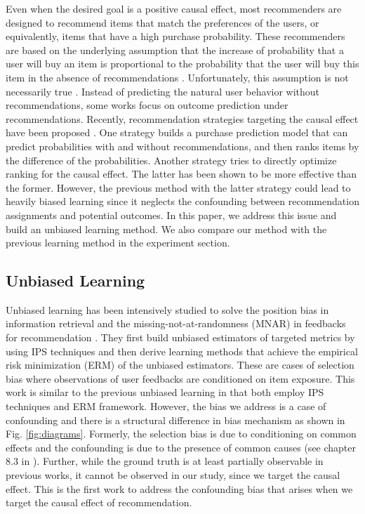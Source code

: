 \documentclass[manuscript,screen]{acmart}
\begin{document}
Even when the desired goal is a positive causal effect, most recommenders are designed to recommend items that match the preferences of the users, or equivalently, items that have a high purchase probability.
These recommenders are based on the underlying assumption that the increase of probability that a user will buy an item is proportional to the probability that the user will buy this item in the absence of recommendations \cite{Shani05}.
Unfortunately, this assumption is not necessarily true \cite{Sato16}.
Instead of predicting the natural user behavior without recommendations, some works \cite{Bonner18, Wang18} focus on outcome prediction under recommendations. 
Recently, recommendation strategies targeting the causal effect have been proposed \cite{Bodapati08, Sato16, Sato19}.
One strategy \cite{Bodapati08, Sato16} builds a purchase prediction model that can predict probabilities with and without recommendations, and then ranks items by the difference of the probabilities.
Another strategy \cite{Sato19} tries to directly optimize ranking for the causal effect.
The latter has been shown to be more effective than the former.
However, the previous method with the latter strategy \cite{Sato19} could lead to heavily biased learning since it neglects the confounding between recommendation assignments and potential outcomes.
In this paper, we address this issue and build an unbiased learning method.
We also compare our method with the previous learning method in the experiment section.

\subsection{Unbiased Learning}
Unbiased learning has been intensively studied to solve the position bias in information retrieval \cite{Joachims17, Ai18, Agarwal19, Hu19} and the missing-not-at-randomness (MNAR) in feedbacks for recommendation \cite{Schnabel16, Wang19, Saito20}.
They first build unbiased estimators of targeted metrics by using IPS techniques \cite{Hirano03,Lunceford04} and then derive learning methods that achieve the empirical risk minimization (ERM) of the unbiased estimators.
These are cases of selection bias where observations of user feedbacks are conditioned on item exposure.
This work is similar to the previous unbiased learning in that both employ IPS techniques and ERM framework.
However, the bias we address is a case of confounding and there is a structural difference in bias mechanism as shown in Fig. \ref{fig:diagrams}.
Formerly, the selection bias is due to conditioning on common effects and the confounding is due to the presence of common causes (see chapter 8.3 in \cite{Hernan20}).
Further, while the ground truth is at least partially observable in previous works, it cannot be observed in our study, since we target the causal effect.
This is the first work to address the confounding bias that arises when we target the causal effect of recommendation. 
\end{document}
